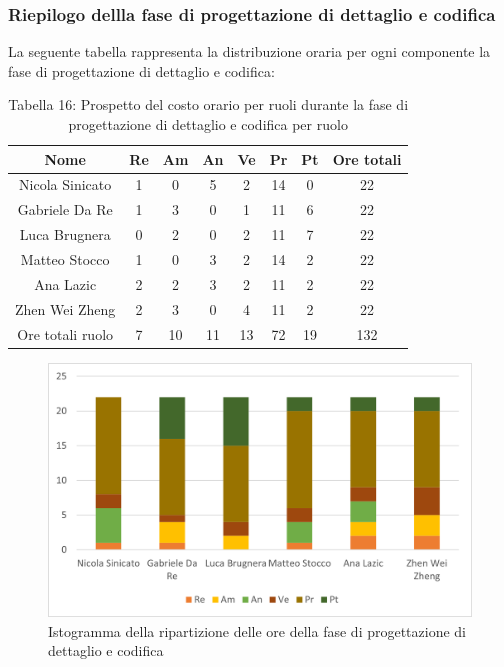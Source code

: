 \subsubsection{Riepilogo dellla fase di progettazione di dettaglio e codifica}
%
La seguente tabella rappresenta la distribuzione oraria per ogni componente la fase di progettazione di dettaglio e codifica:
\begin{table}[h]
	\setlength\extrarowheight{5pt}
	\centering
	\begin{tabularx}{\textwidth}{|ccccccc|c|}
		\hline
		\rowcolor{white}
		\textbf{Nome} & \textbf{Re} & \textbf{Am} & \textbf{An} & \textbf{Ve} & \textbf{Pr}& \textbf{Pt} & \textbf{Ore totali} \\
		\hline
		Nicola Sinicato &1&0&5&2&14&0&22 \\
		Gabriele Da Re &1&3&0&1&11&6&22 \\
		Luca Brugnera &0&2&0&2&11&7&22 \\
		Matteo Stocco &1&0&3&2&14&2&22 \\
		Ana Lazic &2&2&3&2&11&2&22 \\
		Zhen Wei Zheng &2&3&0&4&11&2&22 \\
		\hline
		Ore totali ruolo &7&10&11&13&72&19&132 \\
		\hline
	\end{tabularx}
	\vspace{10pt}
	\caption{Tabella 16: Prospetto del costo orario per ruoli durante la fase di progettazione di dettaglio e codifica per ruolo}
\end{table}
\begin{figure}[H]
    \centering
    \includegraphics[scale=0.6]{img/grafi preventivo/istogrammi/codifica/complessivo.png}
    \caption{Istogramma della ripartizione delle ore della fase di progettazione di dettaglio e codifica}
\end{figure}
